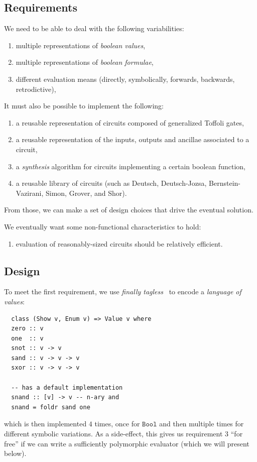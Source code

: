 \documentclass[sigplan,screen]{acmart}
\theoremstyle{definition}
\begin{document}
\subsection{Requirements}

We need to be able to deal with the following variabilities:
\begin{enumerate}
  \item multiple representations of \emph{boolean values},
  \item multiple representations of \emph{boolean formulae},
  \item different evaluation means (directly, symbolically, forwards,
    backwards, retrodictive),
\end{enumerate}

\noindent It must also be possible to implement the following:
\begin{enumerate}[resume]
  \item a reusable representation of circuits composed of generalized Toffoli gates,
  \item a reusable representation of the inputs, outputs and ancillae associated to
    a circuit,
  \item a \emph{synthesis} algorithm for circuits implementing a certain boolean
    function,
  \item a reusable library of circuits (such as
    Deutsch, Deutsch-Jozsa, Bernstein-Vazirani, Simon, Grover, and Shor).
\end{enumerate}
\noindent From those, we can make a
set of design choices that drive the eventual solution.

We eventually want some non-functional characteristics to hold:
\begin{enumerate}[resume]
  \item evaluation of reasonably-sized circuits should be relatively efficient.
\end{enumerate}

\subsection{Design}

To meet the first requirement, we use \emph{finally tagless}~\cite{tagless}
to encode a \emph{language of values}:
\begin{verbatim}
  class (Show v, Enum v) => Value v where
  zero :: v
  one  :: v
  snot :: v -> v
  sand :: v -> v -> v
  sxor :: v -> v -> v

  -- has a default implementation
  snand :: [v] -> v -- n-ary and
  snand = foldr sand one
\end{verbatim}
\noindent which is then implemented $4$ times, once for $\texttt{Bool}$
and then multiple times for different symbolic variations. As a side-effect,
this gives us requirement $3$ ``for free'' if we can write a sufficiently
polymorphic evaluator (which we will present below).
\end{document}
